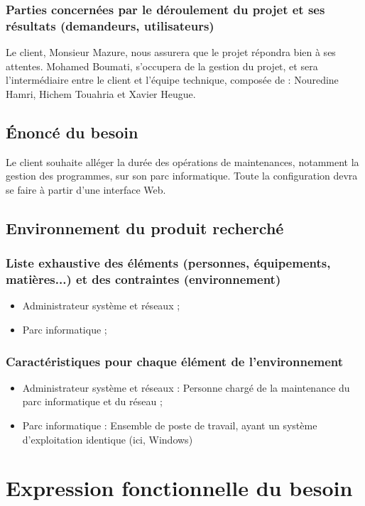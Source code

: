 \documentclass[11pt]{article}
\begin{document}
  \subsubsection{Parties concernées par le déroulement du projet et ses résultats (demandeurs, utilisateurs)}
  Le client, Monsieur Mazure, nous assurera que le projet répondra bien à ses attentes. Mohamed Boumati, s'occupera de la gestion du projet, et sera l'intermédiaire entre le client et l'équipe technique, composée de : Nouredine Hamri, Hichem Touahria et Xavier Heugue.
\subsection{Énoncé du besoin}
  Le client souhaite alléger la durée des opérations de maintenances, notamment la gestion des programmes, sur son parc informatique. Toute la configuration devra se faire à partir d'une interface Web.

\subsection{Environnement du produit recherché}
  \subsubsection{Liste exhaustive des éléments (personnes, équipements, matières...) et des contraintes (environnement)}
  \begin{itemize}
     \item Administrateur système et réseaux ;
     \item Parc informatique ;
  \end{itemize}

  \subsubsection{Caractéristiques pour chaque élément de l'environnement}
  \begin{itemize}
     \item  Administrateur système et réseaux : Personne chargé de la maintenance du parc informatique et du réseau ;
     \item Parc informatique : Ensemble de poste de travail, ayant un système d'exploitation identique (ici, Windows)
  \end{itemize}

\section{Expression fonctionnelle du besoin}
\end{document}
